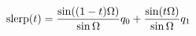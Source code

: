 \documentclass[preview]{standalone}
\begin{document}
\begin{align*}
\special{dvisvgm:raw <g id='unique000'>}\mathrm{slerp}(t)=\frac{\sin((1-t)\Omega)}{\sin\Omega}q_0+\frac{\sin(t\Omega)}{\sin\Omega}q_1\special{dvisvgm:raw </g>}
\end{align*}
\end{document}
